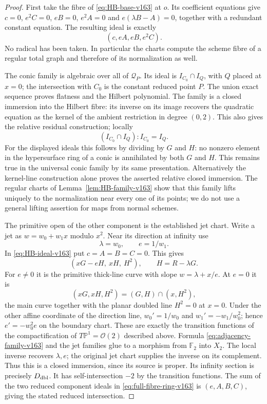 \documentclass[11pt,reqno]{amsart}
\numberwithin{equation}{section}
\theoremstyle{definition}\newtheorem{definition}[theorem]{Definition}
\theoremstyle{remark}\newtheorem{remark}[theorem]{Remark}
\newcommand{\Pj}{\mathbb P}\newcommand{\A}{\mathbb A}
\newcommand{\OO}{\mathcal O}\newcommand{\II}{\mathcal I}
\begin{document}
\begin{proof}
First take the fibre of \eqref{eq:HB-base-v163} at $o$. Its coefficient
equations give $c=0$, $e^2C=0$, $eB=0$, $e^2A=0$ and
$e(\lambda B-A)=0$, together with a redundant constant equation.
The resulting ideal is exactly
\[
                    (c,eA,eB,e^2C).
\]
No radical has been taken. In particular the charts compute the
scheme fibre of a regular total graph and therefore of its
normalization as well.

The conic family is algebraic over all of $\mathcal Q_P$. Its ideal
is $I_{C_0}\cap I_Q$, with $Q$ placed at $x=0$; the intersection
with $C_0$ is the constant reduced point $P$. The union exact
sequence proves flatness and the Hilbert polynomial. The family
is a closed immersion into the Hilbert fibre: its inverse on its
image recovers the quadratic equation as the kernel of the ambient
restriction in degree $(0,2)$. This also gives the relative residual
construction; locally
\[
              (I_{C_0}\cap I_Q):I_{C_0}=I_Q.
\]
For the displayed ideals this follows by dividing by $G$ and $H$:
no nonzero element in the hypersurface ring of a conic is annihilated
by both $G$ and $H$. This remains true in the universal conic family
by its same presentation. Alternatively the kernel-line construction
alone proves the asserted relative closed immersion. The regular
charts of Lemma~\ref{lem:HB-family-v163} show that this family lifts
uniquely to the normalization near every one of its points; we do
not use a general lifting assertion for maps from normal schemes.

The primitive open of the other component is the established jet
chart. Write a jet as $w=w_0+w_1x$ modulo $x^2$. Near its direction
at infinity use
\[
             \lambda=w_0,\qquad e=1/w_1.
\]
In \eqref{eq:HB-ideal-v163} put $c=A=B=C=0$. This gives
\begin{equation}\label{eq:adjacency-family-v163}
         (xG-eH,\ xH,\ H^2),\qquad H=R-\lambda G.
\end{equation}
For $e\ne0$ it is the primitive thick-line curve with slope
$w=\lambda+x/e$. At $e=0$ it is
\[
               (xG,xH,H^2)=(G,H)\cap(x,H^2),
\]
the main curve together with the planar doubled line $H^2=0$ at
$x=0$. Under the other affine coordinate of the direction line,
$w_0'=1/w_0$ and $w_1'=-w_1/w_0^2$; hence
$e'=-w_0^2e$ on the boundary chart. These are exactly the transition
functions of the compactification of $T\Pj^1=\OO(2)$ described
above. Formula \eqref{eq:adjacency-family-v163} and the jet families
glue to a morphism from $\mathbb F_2$ into $X_2$. The local inverse
recovers $\lambda,e$; the original jet chart supplies the inverse
on its complement. Thus this is a closed immersion, since its
source is proper. Its infinity section is precisely $D_{\rm dbl}$.
It has self-intersection $-2$ by the transition functions. The sum
of the two reduced component ideals in \eqref{eq:full-fibre-ring-v163}
is $(e,A,B,C)$, giving the stated reduced intersection.


\end{proof}
\end{document}
